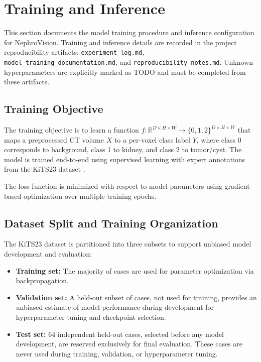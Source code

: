 \section{Training and Inference}

This section documents the model training procedure and inference configuration for NephroVision. Training and inference details are recorded in the project reproducibility artifacts: \texttt{experiment\_log.md}, \texttt{model\_training\_documentation.md}, and \texttt{reproducibility\_notes.md}. Unknown hyperparameters are explicitly marked as TODO and must be completed from these artifacts.

\subsection{Training Objective}

The training objective is to learn a function $f: \mathbb{R}^{D \times H \times W} \rightarrow \{0, 1, 2\}^{D \times H \times W}$ that maps a preprocessed CT volume $X$ to a per-voxel class label $Y$, where class 0 corresponds to background, class 1 to kidney, and class 2 to tumor/cyst. The model is trained end-to-end using supervised learning with expert annotations from the KiTS23 dataset \cite{kits23}.


The loss function is minimized with respect to model parameters using gradient-based optimization over multiple training epochs.

\subsection{Dataset Split and Training Organization}

The KiTS23 dataset is partitioned into three subsets to support unbiased model development and evaluation:

\begin{itemize}
    \item \textbf{Training set:} The majority of cases are used for parameter optimization via backpropagation.
    \item \textbf{Validation set:} A held-out subset of cases, not used for training, provides an unbiased estimate of model performance during development for hyperparameter tuning and checkpoint selection.
    \item \textbf{Test set:} 64 independent held-out cases, selected before any model development, are reserved exclusively for final evaluation. These cases are never used during training, validation, or hyperparameter tuning.
\end{itemize}

